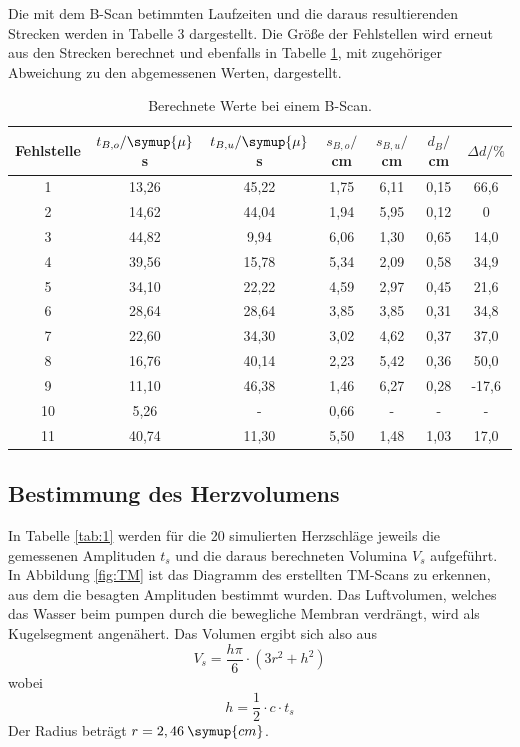 Die mit dem B-Scan betimmten Laufzeiten und die daraus resultierenden Strecken werden in Tabelle 3 dargestellt.
Die Größe der Fehlstellen wird erneut aus den Strecken berechnet und ebenfalls in Tabelle \ref{tab:2}, mit zugehöriger Abweichung
zu den abgemessenen Werten, dargestellt.

\begin{table}[H]
  \centering
  \caption{Berechnete Werte bei einem B-Scan.}
  \label{tab:2}
  \begin{tabular}{c c c c c c c}
    \toprule
  Fehlstelle & $t_{B,o}/\symup{\mu}$s & $t_{B,u}/ \symup{\mu}$s  & $s_{B,o}/$cm & $s_{B,u}/$cm & $d_B/$cm & $\Delta d/ \%$\\
    \midrule
    1  & 13,26 &  45,22 & 1,75 & 6,11  & 0,15 & 66,6      \\
    2  & 14,62 &  44,04 & 1,94 & 5,95  & 0,12 & 0  \\
    3  & 44,82 &  9,94  & 6,06 & 1,30  & 0,65 & 14,0  \\
    4  & 39,56 &  15,78 & 5,34 & 2,09  & 0,58 & 34,9  \\
    5  & 34,10 &  22,22 & 4,59 & 2,97  & 0,45 & 21,6   \\
    6  & 28,64 &  28,64 & 3,85 & 3,85  & 0,31 & 34,8   \\
    7  & 22,60 &  34,30 & 3,02 & 4,62  & 0,37 & 37,0   \\
    8  & 16,76 &  40,14 & 2,23 & 5,42  & 0,36 & 50,0    \\
    9  & 11,10 &  46,38 & 1,46 & 6,27  & 0,28 & -17,6    \\
    10 & 5,26  &  -     &  0,66 & -    & -    &  -      \\
    11 & 40,74 &  11,30 &  5,50 & 1,48 & 1,03 & 17,0   \\
    \bottomrule
  \end{tabular}
\end{table}



\subsection{Bestimmung des Herzvolumens}
In Tabelle \ref{tab:1} werden für die 20 simulierten Herzschläge jeweils die gemessenen Amplituden $t_s$ und die daraus berechneten
Volumina $V_s$ aufgeführt. In Abbildung \ref{fig:TM} ist das Diagramm des erstellten TM-Scans zu erkennen, aus dem die besagten Amplituden
bestimmt wurden. Das Luftvolumen, welches das Wasser beim pumpen durch die bewegliche Membran verdrängt, wird als
Kugelsegment angenähert. Das Volumen ergibt sich also aus
\begin{equation*}
  V_s = \frac{h\pi}{6}\cdot(3r^2 + h^2)
\end{equation*}
wobei
\begin{equation*}
  h = \frac{1}{2}\cdot c \cdot t_s
\end{equation*}
Der Radius beträgt $r = 2,46 \: \symup{cm}$.

